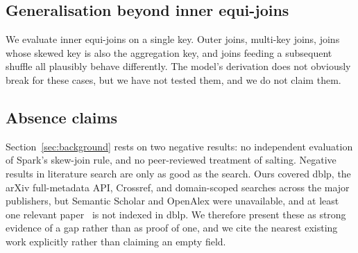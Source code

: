 \subsection{Generalisation beyond inner equi-joins}

We evaluate inner equi-joins on a single key. Outer joins, multi-key joins,
joins whose skewed key is also the aggregation key, and joins feeding a
subsequent shuffle all plausibly behave differently. The model's derivation
does not obviously break for these cases, but we have not tested them, and we
do not claim them.

\subsection{Absence claims}

Section~\ref{sec:background} rests on two negative results: no independent
evaluation of Spark's skew-join rule, and no peer-reviewed treatment of
salting. Negative results in literature search are only as good as the search.
Ours covered dblp, the arXiv full-metadata API, Crossref, and domain-scoped
searches across the major publishers, but Semantic Scholar and OpenAlex were
unavailable, and at least one relevant paper~\cite{phan2022skewjoin} is not
indexed in dblp. We therefore present these as strong evidence of a gap rather
than as proof of one, and we cite the nearest existing work explicitly rather
than claiming an empty field.
